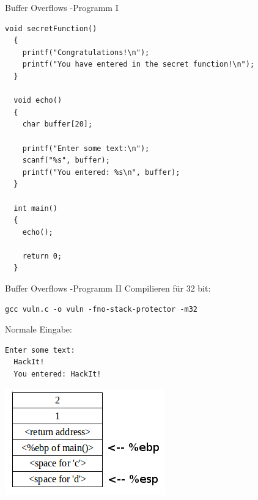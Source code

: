 \documentclass[10pt]{beamer}
\begin{document}
\begin{frame}[fragile]{Buffer Overflows -Programm I}
  \begin{lstlisting}[style=CStyle]
  void secretFunction()
  {
    printf("Congratulations!\n");
    printf("You have entered in the secret function!\n");
  }

  void echo()
  {
    char buffer[20];

    printf("Enter some text:\n");
    scanf("%s", buffer);
    printf("You entered: %s\n", buffer);
  }

  int main()
  {
    echo();

    return 0;
  }
  \end{lstlisting}
\end{frame}

\begin{frame}[fragile]{Buffer Overflows -Programm II}
  Compilieren f\"ur 32 bit:
  \begin{lstlisting}[style=BashStyle]
  gcc vuln.c -o vuln -fno-stack-protector -m32
  \end{lstlisting}

  Normale Eingabe:
  \begin{lstlisting}[style=BashStyle]
  Enter some text:
  HackIt!
  You entered: HackIt!
  \end{lstlisting}

  \includegraphics[scale=0.5]{stack}
\end{frame}
\end{document}
